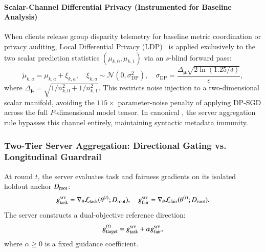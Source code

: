 \paragraph{Scalar-Channel Differential Privacy (Instrumented for Baseline Analysis)}
When clients release group disparity telemetry for baseline metric coordination or privacy auditing, Local Differential Privacy (LDP)~\citep{mironov2017renyi, dwork2014algorithmic} is applied exclusively to the two scalar prediction statistics $(\mu_{k,0}, \mu_{k,1})$ via an $s$-blind forward pass:
\begin{equation}
\label{eq:scalar_dp}
\tilde{\mu}_{k,a} = \mu_{k,a} + \xi_{k,a}, \quad \xi_{k,a} \sim \mathcal{N}\left(0, \sigma_{\mathrm{DP}}^2\right), \quad \sigma_{\mathrm{DP}} = \frac{\Delta_{\bm{\mu}}\sqrt{2\ln(1.25/\delta)}}{\epsilon},
\end{equation}
where $\Delta_{\bm{\mu}} = \sqrt{1/n_{k,0}^2 + 1/n_{k,1}^2}$. This restricts noise injection to a two-dimensional scalar manifold, avoiding the $115\times$ parameter-noise penalty of applying DP-SGD across the full $P$-dimensional model tensor. In canonical \MethodName{}, the server aggregation rule bypasses this channel entirely, maintaining syntactic metadata immunity.

\subsubsection{Two-Tier Server Aggregation: Directional Gating vs. Longitudinal Guardrail}
At round $t$, the server evaluates task and fairness gradients on its isolated holdout anchor $D_{\mathrm{root}}$:
\begin{equation}
\label{eq:srv_grads}
g_{\mathrm{task}}^{\mathrm{srv}} = \nabla_\theta \mathcal{L}_{\mathrm{task}}(\theta^{(t)}; D_{\mathrm{root}}), \quad g_{\mathrm{fair}}^{\mathrm{srv}} = \nabla_\theta \mathcal{L}_{\mathrm{fair}}(\theta^{(t)}; D_{\mathrm{root}}).
\end{equation}
The server constructs a dual-objective reference direction:
\begin{equation}
\label{eq:gtarg_def}
g_{\mathrm{target}}^{(t)} = g_{\mathrm{task}}^{\mathrm{srv}} + \alpha g_{\mathrm{fair}}^{\mathrm{srv}},
\end{equation}
where $\alpha \ge 0$ is a fixed guidance coefficient.


